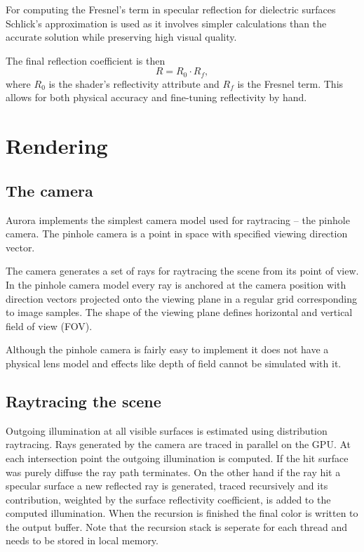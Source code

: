 For computing the Fresnel's term in specular reflection for dielectric surfaces Schlick's approximation \parencite{schlick94} is used as it involves simpler calculations than the accurate solution while preserving high visual quality.

The final reflection coefficient is then
\begin{equation}
  R = R_{0} \cdot R_{f},
\end{equation}
where $R_{0}$ is the shader's reflectivity attribute and $R_{f}$ is the Fresnel term. This allows for both physical accuracy and fine-tuning reflectivity by hand.

\section{Rendering}

\subsection{The camera}
Aurora implements the simplest camera model used for raytracing -- the pinhole camera. The pinhole camera is a point in space with specified viewing direction vector.

The camera generates a set of rays for raytracing the scene from its point of view. In the pinhole camera model every ray is anchored at the camera position with direction vectors projected onto the viewing plane in a regular grid corresponding to image samples. The shape of the viewing plane defines horizontal and vertical field of view (FOV).

Although the pinhole camera is fairly easy to implement it does not have a physical lens model and effects like depth of field cannot be simulated with it.

\subsection{Raytracing the scene}
Outgoing illumination at all visible surfaces is estimated using distribution raytracing. Rays generated by the camera are traced in parallel on the GPU. At each intersection point the outgoing illumination is computed. If the hit surface was purely diffuse the ray path terminates. On the other hand if the ray hit a specular surface a new reflected ray is generated, traced recursively and its contribution, weighted by the surface reflectivity coefficient, is added to the computed illumination. When the recursion is finished the final color is written to the output buffer. Note that the recursion stack is seperate for each thread and needs to be stored in local memory.

